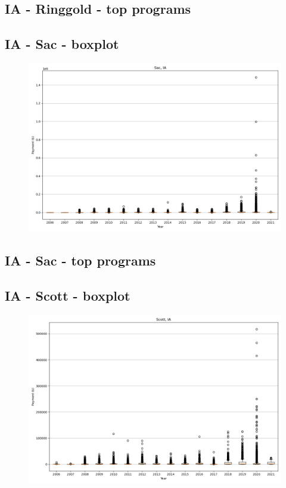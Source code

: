\subsection*{IA - Ringgold - top programs}

\newpage
\subsection*{IA - Sac - boxplot}
\begin{figure}[h]
\centering
\includegraphics[width=7in]{../output/boxplots/counties/Sac-IA_boxplot.png}
\end{figure}


\subsection*{IA - Sac - top programs}

\newpage
\subsection*{IA - Scott - boxplot}
\begin{figure}[h]
\centering
\includegraphics[width=7in]{../output/boxplots/counties/Scott-IA_boxplot.png}
\end{figure}


